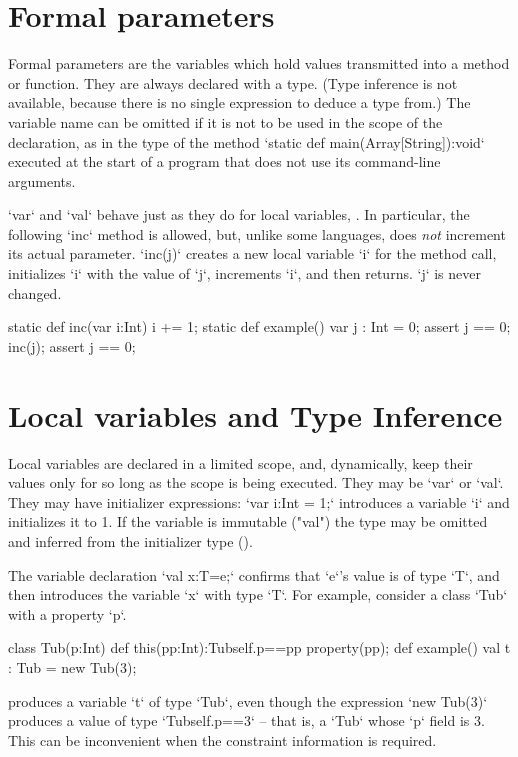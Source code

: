 \section{Formal parameters}
\label{sect:formal-parameters}


Formal parameters are the variables which hold values transmitted into a
method or function.  
They are always declared with a type.  (Type inference is not
available, because there is no single expression to deduce a type from.)
The variable name can be omitted if it is not to be used in the
scope of the declaration, as in the type of the method 
\xcd`static def main(Array[String]):void` executed at the start of a program that
does not use its command-line arguments.

\xcd`var` and \xcd`val` behave just as they do for local
variables, .  In particular, the following \xcd`inc`
method is allowed, but, unlike some languages, does {\em not} increment its
actual parameter.  \xcd`inc(j)` creates a new local 
variable \xcd`i` for the method call, initializes \xcd`i` with the value of
\xcd`j`, increments \xcd`i`, and then returns.  \xcd`j` is never changed.
\begin{xten}
static def inc(var i:Int) { i += 1; }
static def example() {
   var j : Int = 0;
   assert j == 0;
   inc(j);
   assert j == 0;
}
\end{xten}


\section{Local variables and Type Inference}
\label{local-variables}
Local variables are declared in a limited scope, and, dynamically, keep their
values only for so long as the scope is being executed.  They may be \xcd`var`
or \xcd`val`.  
They may have 
initializer expressions: \xcd`var i:Int = 1;` introduces 
a variable \xcd`i` and initializes it to 1.
If the variable is immutable
(\xcd"val")
the type may be omitted and
inferred from the initializer type ().

The variable declaration \xcd`val x:T=e;` confirms that \xcd`e`'s value is of
type \xcd`T`, and then introduces the variable \xcd`x` with type \xcd`T`.  For
example, consider a class \xcd`Tub` with a property \xcd`p`.
\begin{xten}
class Tub(p:Int){
  def this(pp:Int):Tub{self.p==pp} {property(pp);}
  def example() {
    val t : Tub = new Tub(3);
  }
}
\end{xten}
%
\noindent
produces a variable \xcd`t` of type \xcd`Tub`, even though the expression
\xcd`new Tub(3)` produces a value of type \xcd`Tub{self.p==3}` -- that is, a
\xcd`Tub`  whose \xcd`p` field is 3.  This can be inconvenient when the
constraint information is required.

